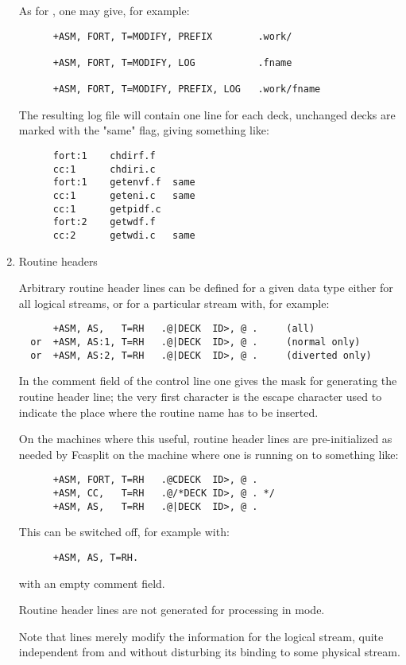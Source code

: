 \begin{enumerate}
As for , one may give, for example:
\begin{verbatim}
      +ASM, FORT, T=MODIFY, PREFIX        .work/

      +ASM, FORT, T=MODIFY, LOG           .fname

      +ASM, FORT, T=MODIFY, PREFIX, LOG   .work/fname
\end{verbatim}
The resulting log file will contain one line for each deck, unchanged decks
are marked with the "same" flag, giving something like:
\begin{verbatim}
      fort:1    chdirf.f
      cc:1      chdiri.c
      fort:1    getenvf.f  same
      cc:1      geteni.c   same
      cc:1      getpidf.c
      fort:2    getwdf.f
      cc:2      getwdi.c   same
\end{verbatim}

\item
Routine headers

Arbitrary routine header lines can be defined for a given data type either
for all logical streams, or for a particular stream with, for example:
\begin{verbatim}
      +ASM, AS,   T=RH   .@|DECK  ID>, @ .     (all)
  or  +ASM, AS:1, T=RH   .@|DECK  ID>, @ .     (normal only)
  or  +ASM, AS:2, T=RH   .@|DECK  ID>, @ .     (diverted only)
\end{verbatim}
In the comment field of the control line one gives the mask for generating
the routine header line; the very first character is the escape character
used to indicate the place where the routine name has to be inserted.

On the machines where this useful, routine header lines are pre-initialized as
needed by Fcasplit on the machine where one is running on to something like:
\begin{verbatim}
      +ASM, FORT, T=RH   .@CDECK  ID>, @ .
      +ASM, CC,   T=RH   .@/*DECK ID>, @ . */
      +ASM, AS,   T=RH   .@|DECK  ID>, @ .
\end{verbatim}
This can be switched off, for example with:
\begin{verbatim}
      +ASM, AS, T=RH.
\end{verbatim}
with an empty comment field.

Routine header lines are not generated for processing in  mode.

Note that  lines merely modify the information for
the logical stream, quite independent from and without disturbing
its binding to some physical stream.



\end{enumerate}
